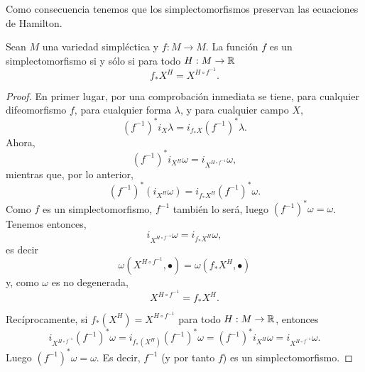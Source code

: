 Como consecuencia tenemos que los simplectomorfismos preservan las ecuaciones de Hamilton.

\begin{prop}
  Sean $M$ una variedad simpléctica y $f:M\rightarrow M$. La función $f$ es un simplectomorfismo si y sólo si para todo $H:M\rightarrow \mathbb{R}$
  \begin{equation*}
    f_*X^H=X^{H\circ f^{-1}}.
  \end{equation*}
\end{prop}
\begin{proof}
  En primer lugar, por una comprobación inmediata se tiene, para cualquier difeomorfismo $f$, para cualquier forma $\lambda$, y para cualquier campo $X$, 
  \begin{equation*}
    (f^{-1})^*i_X \lambda = i_{f_*X}(f^{-1})^* \lambda.
  \end{equation*}
  Ahora,
  \begin{equation*}
    (f^{-1})^*i_{X^H}\omega=i_{X^{H \circ f^{-1}}}\omega,
  \end{equation*}
  mientras que, por lo anterior,
  \begin{equation*}
    (f^{-1})^*(i_{X^H}\omega)=i_{f_*X^H} (f^{-1})^*\omega.
  \end{equation*}
  Como $f$ es un simplectomorfismo, $f^{-1}$ también lo será, luego $(f^{-1})^* \omega = \omega$.
  Tenemos entonces,
  \begin{equation*}
    i_{X^{H \circ f^{-1}}} \omega = i_{f_*X^H}\omega,
  \end{equation*}
  es decir 
  \begin{equation*}
    \omega(X^{H\circ f^{-1}},\bullet)=\omega(f_*X^H,\bullet)
  \end{equation*}
  y, como $\omega$ es no degenerada,
  \begin{equation*}
    X^{H \circ f^{-1}}=f_*X^H.
  \end{equation*}

  Recíprocamente, si $f_*(X^H)=X^{H \circ f^{-1}}$ para todo $H:M \rightarrow \mathbb{R}$, entonces
  \begin{equation*}
    i_{X^{H\circ f^{-1}}}(f^{-1})^* \omega=i_{f_*(X^H)}(f^{-1})^* \omega = (f^{-1})^*i_{X^H}\omega=i_{X^{H \circ f^{-1}}}\omega.
  \end{equation*}
  Luego $(f^{-1})^* \omega = \omega$. Es decir, $f^{-1}$ (y por tanto $f$) es un simplectomorfismo.
\end{proof}

